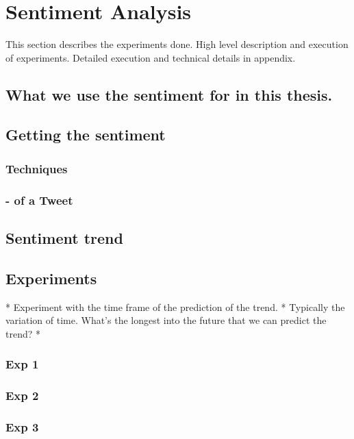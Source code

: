 
\section{Sentiment Analysis}
This section describes the experiments done. High level description and
execution of experiments. Detailed execution and technical details in appendix. 

\subsection{What we use the sentiment for in this thesis.}
\subsection{Getting the sentiment}
\subsubsection{Techniques}
\subsubsection{- of a Tweet}
\subsection{Sentiment trend}
\subsection{Experiments}

* Experiment with the time frame of the prediction of the trend. 
	* Typically the variation of time. What's the longest into the future that
we can predict the trend?
* 


\subsubsection{Exp 1}
\subsubsection{Exp 2}
\subsubsection{Exp 3}
